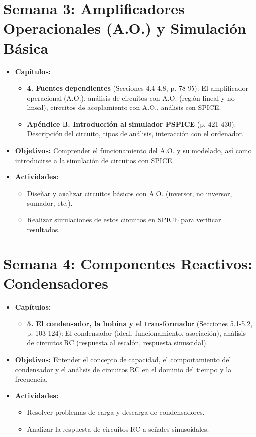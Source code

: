 \documentclass[12pt,a4paper]{article}
\begin{document}
\section{Semana 3: Amplificadores Operacionales (A.O.) y Simulación Básica}
\begin{itemize}
    \item \textbf{Capítulos:}
    \begin{itemize}
        \item \textbf{4. Fuentes dependientes} (Secciones 4.4-4.8, p. 78-95): El amplificador operacional (A.O.), análisis de circuitos con A.O. (región lineal y no lineal), circuitos de acoplamiento con A.O., análisis con SPICE.
        \item \textbf{Apéndice B. Introducción al simulador PSPICE} (p. 421-430): Descripción del circuito, tipos de análisis, interacción con el ordenador.
    \end{itemize}
    \item \textbf{Objetivos:} Comprender el funcionamiento del A.O. y su modelado, así como introducirse a la simulación de circuitos con SPICE.
    \item \textbf{Actividades:}
    \begin{itemize}
        \item Diseñar y analizar circuitos básicos con A.O. (inversor, no inversor, sumador, etc.).
        \item Realizar simulaciones de estos circuitos en SPICE para verificar resultados.
    \end{itemize}
\end{itemize}

\section{Semana 4: Componentes Reactivos: Condensadores}
\begin{itemize}
    \item \textbf{Capítulos:}
    \begin{itemize}
        \item \textbf{5. El condensador, la bobina y el transformador} (Secciones 5.1-5.2, p. 103-124): El condensador (ideal, funcionamiento, asociación), análisis de circuitos RC (respuesta al escalón, respuesta sinusoidal).
    \end{itemize}
    \item \textbf{Objetivos:} Entender el concepto de capacidad, el comportamiento del condensador y el análisis de circuitos RC en el dominio del tiempo y la frecuencia.
    \item \textbf{Actividades:}
    \begin{itemize}
        \item Resolver problemas de carga y descarga de condensadores.
        \item Analizar la respuesta de circuitos RC a señales sinusoidales.
    \end{itemize}
\end{itemize}
\end{document}
